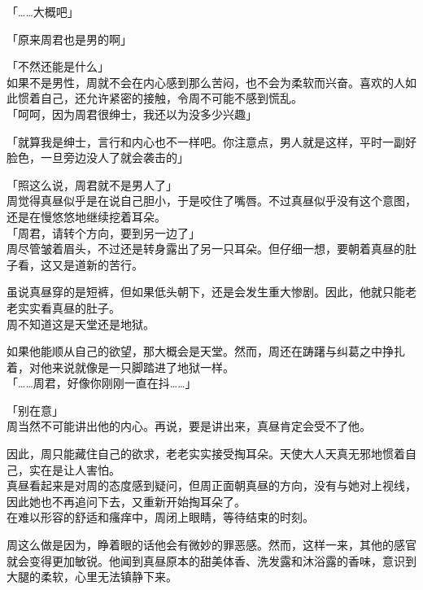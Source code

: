 「……大概吧」

「原来周君也是男的啊」

「不然还能是什么」\\

如果不是男性，周就不会在内心感到那么苦闷，也不会为柔软而兴奋。喜欢的人如此惯着自己，还允许紧密的接触，令周不可能不感到慌乱。\\

「呵呵，因为周君很绅士，我还以为没多少兴趣」

「就算我是绅士，言行和内心也不一样吧。你注意点，男人就是这样，平时一副好脸色，一旦旁边没人了就会袭击的」

「照这么说，周君就不是男人了」\\

周觉得真昼似乎是在说自己胆小，于是咬住了嘴唇。不过真昼似乎没有这个意图，还是在慢悠悠地继续挖着耳朵。\\

「周君，请转个方向，要到另一边了」\\

周尽管皱着眉头，不过还是转身露出了另一只耳朵。但仔细一想，要朝着真昼的肚子看，这又是道新的苦行。

虽说真昼穿的是短裤，但如果低头朝下，还是会发生重大惨剧。因此，他就只能老老实实看真昼的肚子。\\

周不知道这是天堂还是地狱。

如果他能顺从自己的欲望，那大概会是天堂。然而，周还在踌躇与纠葛之中挣扎着，对他来说就像是一只脚踏进了地狱一样。\\

「……周君，好像你刚刚一直在抖……」

「别在意」\\

周当然不可能讲出他的内心。再说，要是讲出来，真昼肯定会受不了他。

因此，周只能藏住自己的欲求，老老实实接受掏耳朵。天使大人天真无邪地惯着自己，实在是让人害怕。\\

真昼看起来是对周的态度感到疑问，但周正面朝真昼的方向，没有与她对上视线，因此她也不再追问下去，又重新开始掏耳朵了。\\

在难以形容的舒适和瘙痒中，周闭上眼睛，等待结束的时刻。

周这么做是因为，睁着眼的话他会有微妙的罪恶感。然而，这样一来，其他的感官就会变得更加敏锐。他闻到真昼原本的甜美体香、洗发露和沐浴露的香味，意识到大腿的柔软，心里无法镇静下来。\\

